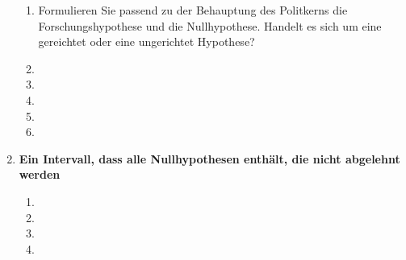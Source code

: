 \documentclass[11pt]{article}
\newcommand{\aufgabe}[1]{\item{\bf #1}}
\begin{document}
\begin{enumerate}
\begin{enumerate}
\item{Formulieren Sie passend zu der Behauptung des Politkerns die Forschungshypothese und die Nullhypothese. Handelt es sich um eine gereichtet 
oder eine ungerichtet Hypothese?}
\item{}
\item{}
\item{}
\item{}
\item{}
\end{enumerate}
\newpage
\aufgabe{Ein Intervall, dass alle Nullhypothesen enthält, die nicht abgelehnt werden} %
\begin{enumerate}
\item{}
\item{}
\item{}
\item{}
\end{enumerate}

\end{enumerate}
\end{document}
